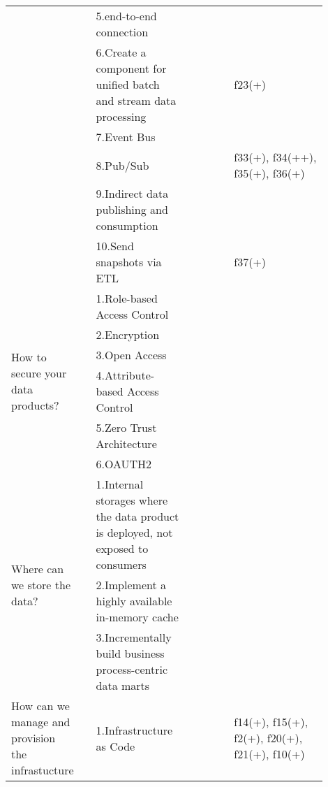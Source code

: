 \begin{tabular}{|p{0.12\linewidth}|p{0.015\linewidth}|p{0.3\linewidth}|p{0.15\linewidth}|p{0.31\linewidth}|}
 & \cellcolor{emerald_shape_6}{} & 5.end-to-end connection&\cellcolor{emerald_shape_3}{s15, s22, s25, s29} & \\
 & \cellcolor{emerald_shape_6}{} & 6.Create a component for unified batch and stream data processing&\cellcolor{emerald_shape_4}{s20, s28, s30, s32, s36, s39, s41, s44} & f23(+)\\
 & \cellcolor{emerald_shape_6}{} & 7.Event Bus&\cellcolor{emerald_shape_1}{s20} & \\
 & \cellcolor{emerald_shape_6}{} & 8.Pub/Sub&\cellcolor{emerald_shape_4}{s30, s32, s37, s38, s39, s41, s53} & f33(+), f34(++), f35(+), f36(+)\\
 & \cellcolor{emerald_shape_6}{} & 9.Indirect data publishing and consumption&\cellcolor{emerald_shape_2}{s41, s43} & \\
 & \multirow{-10}{\linewidth}{ \cellcolor{emerald_shape_6}{30}} &10.Send snapshots via ETL&\cellcolor{emerald_shape_1}{s41} & f37(+)\\
\multirow{6}{\linewidth}{How to secure your data products?} &\cellcolor{emerald_shape_3}{} &1.Role-based Access Control&\cellcolor{emerald_shape_6}{s4, s6, s12, s15, s36} & \\
 & \cellcolor{emerald_shape_3}{} & 2.Encryption&\cellcolor{emerald_shape_4}{s4, s5} & \\
 & \cellcolor{emerald_shape_3}{} & 3.Open Access&\cellcolor{emerald_shape_3}{s23} & \\
 & \cellcolor{emerald_shape_3}{} & 4.Attribute-based Access Control&\cellcolor{emerald_shape_3}{s36} & \\
 & \cellcolor{emerald_shape_3}{} & 5.Zero Trust Architecture&\cellcolor{emerald_shape_3}{s45} & \\
 & \multirow{-6}{\linewidth}{ \cellcolor{emerald_shape_3}{8}} &6.OAUTH2&\cellcolor{emerald_shape_3}{s45} & \\
\multirow{3}{\linewidth}{Where can we store the data?} &\cellcolor{emerald_shape_4}{} &1.Internal storages where the data product is deployed, not exposed to consumers&\cellcolor{emerald_shape_6}{s4, s13, s15, s32, s36, s49} & \\
 & \cellcolor{emerald_shape_4}{} & 2.Implement a highly available in-memory cache&\cellcolor{emerald_shape_5}{s4, s5, s14, s15, s18} & \\
 & \multirow{-3}{\linewidth}{ \cellcolor{emerald_shape_4}{12}} &3.Incrementally build business process-centric data marts&\cellcolor{emerald_shape_4}{s20, s43, s52} & \\
\multirow{9}{\linewidth}{How can we manage and provision the infrastucture} &\cellcolor{emerald_shape_5}{} &1.Infrastructure as Code&\cellcolor{emerald_shape_4}{s6, s9, s15, s19, s28, s30} & f14(+), f15(+), f2(+), f20(+), f21(+), f10(+)\\

\end{tabular}
